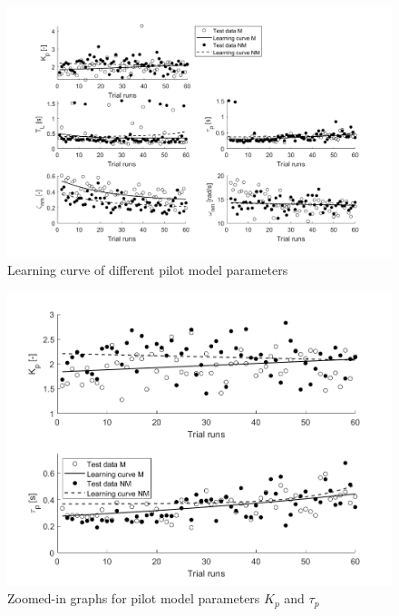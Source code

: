 \documentclass[conference]{IEEEtran}
\begin{document}
\begin{figure}[h!]
    \centering
    \includegraphics[width=0.9\linewidth]{images/pilot_model2.png}
    \caption{Learning curve of different pilot model parameters}
    \label{fig:pilotmodel}
\end{figure}


\begin{figure}[h!]
    \centering
    \includegraphics[width=\linewidth]{images/pilot_model_zoomed.png}
    \caption{Zoomed-in graphs for pilot model parameters $K_p$ and $\tau_p$}
    \label{fig:zoomed_pilotmodel}
\end{figure}
\end{document}

